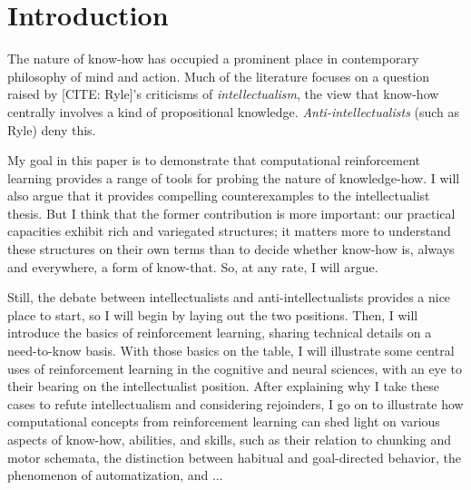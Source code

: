 \section{Introduction}

The nature of know-how has occupied a prominent place in contemporary philosophy of mind and action.
Much of the literature focuses on a question raised by [CITE: Ryle]'s criticisms of \emph{intellectualism}, the view that know-how centrally involves a kind of propositional knowledge.
\emph{Anti-intellectualists} (such as Ryle) deny this.

My goal in this paper is to demonstrate that computational reinforcement learning provides a range of tools for probing the nature of knowledge-how.
I will also argue that it provides compelling counterexamples to the intellectualist thesis.
But I think that the former contribution is more important: our practical capacities exhibit rich and variegated structures; it matters more to understand these structures on their own terms than to decide whether know-how is, always and everywhere, a form of know-that.
So, at any rate, I will argue.

Still, the debate between intellectualists and anti-intellectualists provides a nice place to start, so I will begin by laying out the two positions.
Then, I will introduce the basics of reinforcement learning, sharing technical details on a need-to-know basis.
With those basics on the table, I will illustrate some central uses of reinforcement learning in the cognitive and neural sciences, with an eye to their bearing on the intellectualist position.
After explaining why I take these cases to refute intellectualism and considering rejoinders, I go on to illustrate how computational concepts from reinforcement learning can shed light on various aspects of know-how, abilities, and skills, such as their relation to chunking and motor schemata, the distinction between habitual and goal-directed behavior, the phenomenon of automatization, and ...
